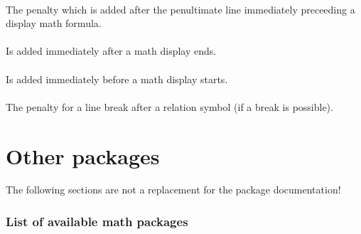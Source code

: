 \begin{table}[htb]
\subsection{}
The penalty which is added after the penultimate line immediately preceeding a display math formula.

\subsection{}
Is added immediately after a math display ends.

\subsection{}
Is added immediately before a math display starts.

\subsection{}
The penalty for a line break after a relation symbol (if a break is possible).


\part{Other packages}
The following sections are not a replacement for the package documentation!
\section{List of available math packages}


\end{table}
